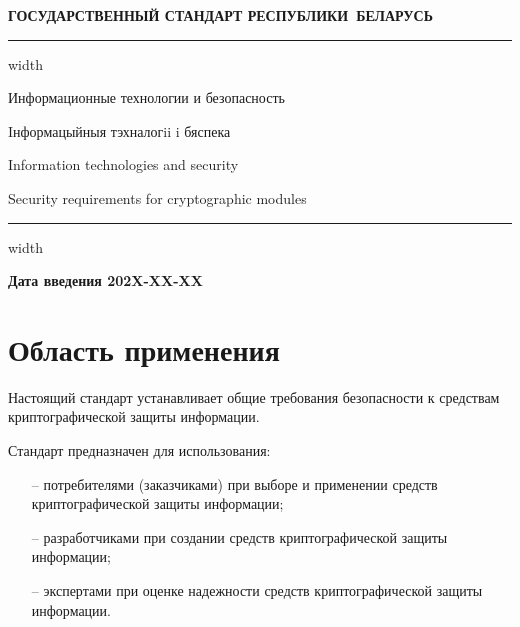 \newpage
\setcounter{page}{1}
\pagestyle{headings}

\begin{center}
{\bfseries
ГОСУДАРСТВЕННЫЙ СТАНДАРТ РЕСПУБЛИКИ~БЕЛАРУСЬ
\vskip 2pt
\hrule width\textwidth

\vskip 9pt

Информационные технологии и безопасность



\vskip 9pt

Iнформацыйныя тэхналогii i бяспека


}

\vskip 9pt

Information technologies and security

Security requirements for cryptographic modules

\vskip 4pt                
\hrule width \textwidth
\end{center}

\mbox{}\hfill{\bfseries Дата введения 202X-XX-XX}

\chapter{Область применения}\label{SCOPE}

Настоящий стандарт устанавливает общие требования безопасности к средствам
криптографической защиты информации. 

Стандарт предназначен для использования:
\begin{itemize}
\item[--]
потребителями (заказчиками) при выборе и применении средств криптографической
защиты информации;

\item[--]
разработчиками при создании средств криптографической защиты информации;

\item[--]
экспертами при оценке надежности средств криптографической защиты 
информации. 
\end{itemize}


